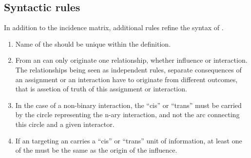 
\subsection{Syntactic rules}
\label{sec:SyntacticRules}

In addition to the incidence matrix, additional rules refine the syntax of \ERs.


\begin{enumerate}
\item Name of the  should be unique within the  definition.
\item From an  can only originate one relationship, whether influence or interaction. The relationships being seen as independent rules, separate consequences of an assignment or an interaction have to originate from different outcomes, that is assetion of truth of this assignment or interaction.
\item In the case of a non-binary interaction, the ``cis'' or ``trans''  must be carried by the circle representing the n-ary interaction, and not the arc connecting this circle and a given interactor.
\item If an  targeting an  carries a ``cis'' or ``trans'' unit of information, at least one of the  must be the same  as the origin of the influence. 

\end{enumerate}
